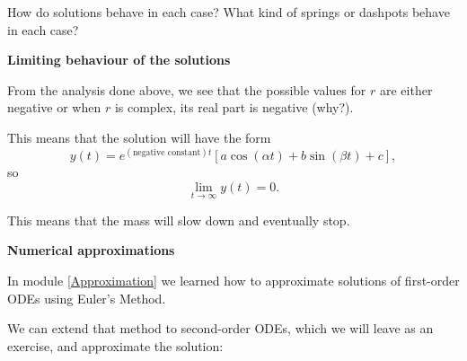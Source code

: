 How do solutions behave in each case?
What kind of springs or dashpots behave in each case?





\hfill

\begin{center}
\textbf{\color{cyan}
Limiting behaviour of the solutions
}
\end{center}


From the analysis done above, we see that the possible values for $r$ are either negative or when $r$ is complex, its real part is negative (why?).

This means that the solution will have the form
$$
y(t) = e^{(\text{negative constant}) t} \left[  a\cos(\alpha t) + b\sin(\beta t) + c\right],
$$
so 
$$
\lim_{t \to \infty} y(t) = 0.
$$

This means that the mass will slow down and eventually stop.


\hfill

\begin{center}
\textbf{\color{cyan}
Numerical approximations
}
\end{center}



In module \ref{Approximation} we learned how to approximate solutions of first-order ODEs using Euler's Method.

We can extend that method to second-order ODEs, which we will leave as an exercise, and approximate the solution:

